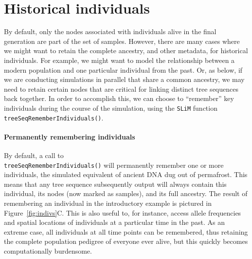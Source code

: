 \documentclass[12pt]{article}
\newcommand{\slim}[0]{\texttt{SLiM}\xspace}
\begin{document}
\section{Historical individuals}
By default, only the nodes associated with individuals alive in the final generation are part of the set of samples.
However, there are many cases where we might want to retain the complete ancestry, and other metadata, for
historical individuals.
For example, we might want to model the relationship between a modern population and
one particular individual from the past.
Or, as below, if we are conducting simulations in parallel that share 
a common ancestry, we may need to retain certain nodes that are critical for linking distinct
tree sequences back together.
In order to accomplish this, we can choose to ``remember'' key individuals during the course of the simulation,
using the \slim function \verb|treeSeqRememberIndividuals()|.

\paragraph{Permanently remembering individuals}
By default, a call to \\ 
\verb|treeSeqRememberIndividuals()| will permanently remember one or more individuals,
the simulated equivalent of ancient DNA dug out of permafrost.
This means that any tree sequence subsequently output will always contain this individual,
its nodes (now marked as samples), and its full ancestry.
The result of remembering an individual in the introductory example is pictured
in Figure~\ref{fig:indivs}C.
This is also useful to, for instance, access allele frequencies and spatial locations of individuals
at a particular time in the past.
As an extreme case, all individuals at all time points can be remembered,
thus retaining the complete population pedigree of everyone ever alive,
but this quickly becomes computationally burdensome.
\end{document}

